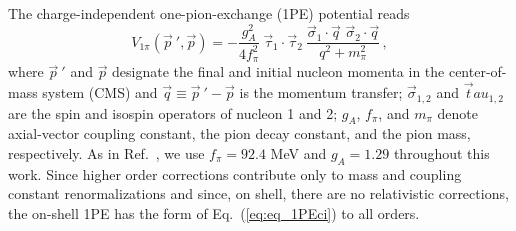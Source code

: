 \documentclass[aps,showpacs,floatfix,nofootinbib,preprintnumbers,superscriptaddress,amsmath,amssymb]{revtex4-1}
\begin{document}
The charge-independent one-pion-exchange (1PE) potential reads
\begin{equation}
V_{1\pi} ({\vec p}~', \vec p) = - 
\frac{g_A^2}{4f_\pi^2}
\: 
{\vec \tau}_1 \cdot {\vec \tau}_2 
\:
\frac{
\vec \sigma_1 \cdot \vec q \,\, \vec \sigma_2 \cdot \vec q}
{q^2 + m_\pi^2} 
\,,
\label{eq:eq_1PEci}
\end{equation}
where ${\vec p}~'$ and $\vec p$ designate the final and initial
nucleon momenta in the center-of-mass system (CMS) and $\vec q \equiv
{\vec p}~' - \vec p$ is the momentum transfer; $\vec \sigma_{1,2}$ and
$\vec tau_{1,2}$ are the spin and isospin operators of nucleon 1 and
2; $g_A$, $f_\pi$, and $m_\pi$ denote axial-vector coupling constant,
the pion decay constant, and the pion mass, respectively. As in Ref.~\cite{carlsson2014}, we use
$f_\pi=92.4$ MeV and $g_A=1.29$ throughout this work.  
Since higher order corrections contribute only to mass
and coupling constant renormalizations and since, on shell, there are
no relativistic corrections, the on-shell 1PE has the form
of Eq.~(\ref{eq:eq_1PEci}) to all orders.
\end{document}
